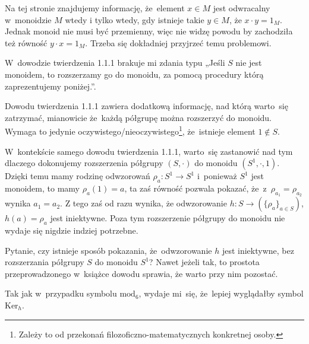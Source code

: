\documentclass[a4paper,11pt]{article}
\begin{document}
\vspace{\spaceFour}



\start {} Na tej stronie znajdujemy informację, że~element
$x \in M$ jest odwracalny w~monoidzie $M$ wtedy i tylko wtedy, gdy
istnieje takie $y \in M$, że $x \cdot y = 1_{ M }$. Jednak monoid nie
musi być przemienny, więc nie widzę powodu by zachodziła też równość
$y \cdot x = 1_{ M }$. Trzeba się dokładniej przyjrzeć temu
problemowi.

\vspace{\spaceFour}



\start {} W~dowodzie twierdzenia 1.1.1 brakuje mi zdania typu
„Jeśli $S$ nie jest monoidem, to rozszerzamy go do monoidu, za pomocą
procedury którą zaprezentujemy poniżej.”.

\vspace{\spaceFour}



\start {} Dowodu twierdzenia 1.1.1 zawiera dodatkową informację,
nad którą warto~się zatrzymać, mianowicie że~każdą półgrupę można
rozszerzyć do monoidu. Wymaga to jedynie
oczywistego/nieoczywistego\footnote{Zależy to od przekonań
  filozoficzno-matematycznych konkretnej osoby.}, że~istnieje element
$1 \notin S$.

W~kontekście samego dowodu twierdzenia 1.1.1, warto~się zastanowić nad
tym dlaczego dokonujemy rozszerzenia półgrupy $( S, \cdot )$ do
monoidu $( S^{ 1 }, \cdot, 1 )$. Dzięki temu mamy rodzinę odwzorowań
$\rho_{ a } : S^{ 1 } \to S^{ 1 }$ i~ponieważ $S^{ 1 }$ jest monoidem,
to mamy $\rho_{ a }( 1 ) = a$, ta zaś równość pozwala pokazać,
że~z~$\rho_{ a_{ 1 } } = \rho_{ a_{ 2 } }$ wynika $a_{ 1 } = a_{ 2 }$.
Z tego zaś od razu wynika, że odwzorowanie
$h : S \to ( \{ \rho_{ a } \}_{ a \in S } )$, $h( a ) = \rho_{ a }$
jest iniektywne. Poza tym rozszerzenie półgrupy do monoidu nie wydaje
się nigdzie indziej potrzebne.

Pytanie, czy istnieje sposób pokazania, że~odwzorowanie $h$ jest
iniektywne, bez rozszerzania półgrupy $S$ do monoidu $S^{ 1 }$? Nawet
jeżeli tak, to prostota przeprowadzonego w~książce dowodu sprawia, że
warto przy nim pozostać.

\vspace{\spaceFour}



\start {} Tak jak w~przypadku symbolu $\textrm{mod}_{ 6 }$,
wydaje mi~się, że~lepiej wyglądałby symbol $\textrm{Ker}_{ h }$.
\end{document}
